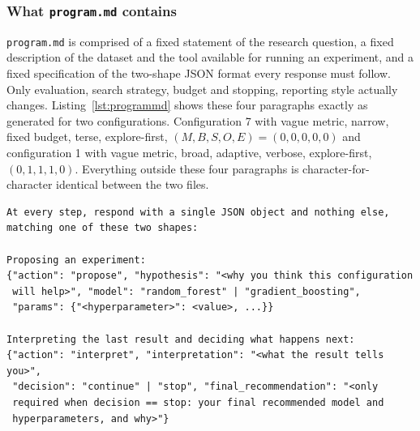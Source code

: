 \documentclass[11pt]{article}
\begin{document}
\subsubsection{What \texttt{program.md} contains}

\texttt{program.md} is comprised of a fixed statement of the research question, a fixed description of the dataset and the tool available for running an experiment, and a fixed specification of the two-shape JSON format every response must follow. Only evaluation, search strategy, budget and stopping, reporting style actually changes. Listing~\ref{lst:programmd} shows these four paragraphs exactly as generated for two configurations. Configuration 7 with vague metric, narrow, fixed budget, terse, explore-first, $(M,B,S,O,E)=(0,0,0,0,0)$ and configuration 1 with vague metric, broad, adaptive, verbose, explore-first, $(0,1,1,1,0)$. Everything outside these four paragraphs is character-for-character identical between the two files.

\begin{lstlisting}[caption={The response format specification. Identical in every one of the 32 possible \texttt{program.md} files.},label={lst:jsonformat}]
At every step, respond with a single JSON object and nothing else,
matching one of these two shapes:

Proposing an experiment:
{"action": "propose", "hypothesis": "<why you think this configuration
 will help>", "model": "random_forest" | "gradient_boosting",
 "params": {"<hyperparameter>": <value>, ...}}

Interpreting the last result and deciding what happens next:
{"action": "interpret", "interpretation": "<what the result tells you>",
 "decision": "continue" | "stop", "final_recommendation": "<only
 required when decision == stop: your final recommended model and
 hyperparameters, and why>"}
\end{lstlisting}
\end{document}
